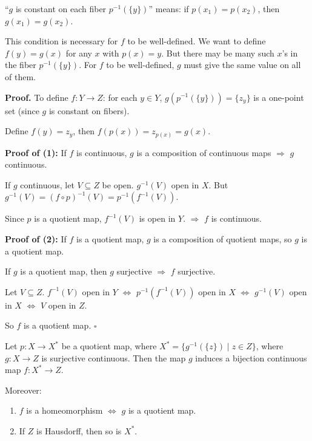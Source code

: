 \documentclass[11pt]{report}
\renewenvironment{proof}[1][Proof]{\noindent\textbf{#1.} }{\hfill$\square$\par\vspace{5pt}}
\begin{document}
\begin{rembox}
``$g$ is constant on each fiber $p^{-1}(\{y\})$'' means: if $p(x_1) = p(x_2)$, then $g(x_1) = g(x_2)$.

This condition is necessary for $f$ to be well-defined. We want to define $f(y) = g(x)$ for any $x$ with $p(x) = y$. But there may be many such $x$'s in the fiber $p^{-1}(\{y\})$. For $f$ to be well-defined, $g$ must give the same value on all of them.
\end{rembox}

\begin{proof}
To define $f: Y \to Z$: for each $y \in Y$, $g(p^{-1}(\{y\})) = \{z_y\}$ is a one-point set (since $g$ is constant on fibers).

Define $f(y) = z_y$, then $f(p(x)) = z_{p(x)} = g(x)$.

\textbf{Proof of (1):} If $f$ is continuous, $g$ is a composition of continuous maps $\Rightarrow$ $g$ continuous.

If $g$ continuous, let $V \subseteq Z$ be open. $g^{-1}(V)$ open in $X$. But $g^{-1}(V) = (f \circ p)^{-1}(V) = p^{-1}(f^{-1}(V))$.

Since $p$ is a quotient map, $f^{-1}(V)$ is open in $Y$. $\Rightarrow$ $f$ is continuous.

\textbf{Proof of (2):} If $f$ is a quotient map, $g$ is a composition of quotient maps, so $g$ is a quotient map.

If $g$ is a quotient map, then $g$ surjective $\Rightarrow$ $f$ surjective.

Let $V \subseteq Z$. $f^{-1}(V)$ open in $Y$ $\Leftrightarrow$ $p^{-1}(f^{-1}(V))$ open in $X$ $\Leftrightarrow$ $g^{-1}(V)$ open in $X$ $\Leftrightarrow$ $V$ open in $Z$.

So $f$ is a quotient map.
\end{proof}

\begin{corbox}
Let $p: X \to X^*$ be a quotient map, where $X^* = \{g^{-1}(\{z\}) \mid z \in Z\}$, where $g: X \to Z$ is surjective continuous. Then the map $g$ induces a bijection continuous map $f: X^* \to Z$.

Moreover:
\begin{enumerate}
    \item $f$ is a homeomorphism $\Leftrightarrow$ $g$ is a quotient map.
    \item If $Z$ is Hausdorff, then so is $X^*$.
\end{enumerate}
\end{corbox}
\end{document}
